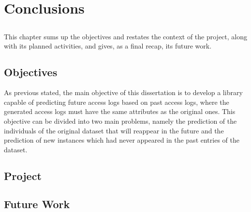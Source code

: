 \chapter{Conclusions}\label{chap:chap4}

\section*{}

This chapter sums up the objectives and restates the context of the project, along with its planned activities, and gives, as a final recap, its future work.

\section{Objectives}

As previous stated, the main objective of this dissertation is to develop a library capable of predicting future access logs based on past access logs, where the generated access logs must have the same attributes as the original ones. This objective can be divided into two main problems, namely the prediction of the individuals of the original dataset that will reappear in the future and the prediction of new instances which had never appeared in the past entries of the dataset. 

\section{Project}



\section{Future Work}

